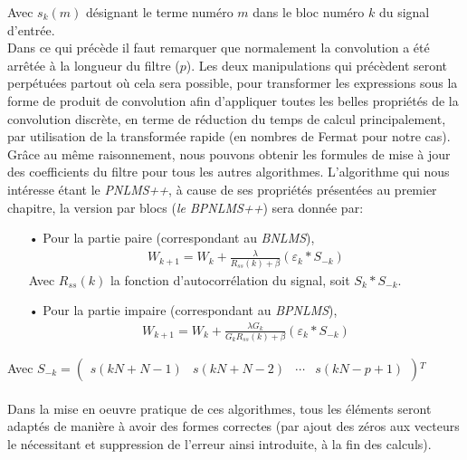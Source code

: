 Avec $ s_{k}(m) $ désignant le terme numéro $ m $ dans le bloc numéro $ k $ du signal d'entrée.\\
Dans ce qui précède il faut remarquer que normalement la convolution a été arrêtée à la longueur du filtre ($ p $). Les deux manipulations qui précèdent seront perpétuées partout où cela sera possible, pour transformer les expressions sous la forme de produit de convolution afin d'appliquer toutes les belles propriétés de la convolution discrète, en terme de réduction du temps de calcul principalement, par utilisation de la transformée rapide (en nombres de Fermat pour notre cas).\\
Grâce au même raisonnement, nous pouvons obtenir les formules de mise à jour des coefficients du filtre pour tous les autres algorithmes. L'algorithme qui nous intéresse étant le \emph{PNLMS++}, à cause de ses propriétés présentées au premier chapitre, la version par blocs (\emph{le BPNLMS++}) sera donnée par:
\begin{itemize}
\item[•] Pour la partie paire (correspondant au \emph{BNLMS}),
\begin{eqnarray}
W_{k+1}=W_{k}+\frac{\lambda}{R_{ss}(k)+\beta}(\varepsilon_{k}\ast S_{-k})
\label{BPNLMS++2}
\end{eqnarray}
Avec $ R_{ss}(k) $ la fonction d'autocorrélation du signal, soit $ S_{k}\ast S_{-k} $.
\item[•] Pour la partie impaire (correspondant au \emph{BPNLMS}),
\begin{eqnarray}
W_{k+1}=W_{k}+\frac{\lambda G_{k}}{G_{k}R_{ss}(k)+\beta}(\varepsilon_{k}\ast S_{-k})
\label{BPNLMS++1}
\end{eqnarray} 
\end{itemize}
Avec $ S_{-k} = $\(\begin{pmatrix}
s(kN+N-1) & s(kN+N-2) & \cdots & s(kN-p+1)
\end{pmatrix}\)$ ^{T} $\\
 \\
Dans la mise en oeuvre pratique de ces algorithmes, tous les éléments seront adaptés de manière à avoir des formes correctes (par ajout des zéros aux vecteurs le nécessitant et suppression de l'erreur ainsi introduite, à la fin des calculs).

